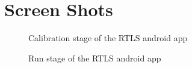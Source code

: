 \chapter{Screen Shots} \label{app:screenies}

  \begin{figure}[htbp!]
  \centering        
  \caption{Calibration stage of the RTLS android app}
  \label{fig:screenies_1}
  \end{figure}
  
   \begin{figure}[htbp!]
  \centering        
  \caption{Run stage of the RTLS android app}
  \label{fig:screenies_2}
  \end{figure}
